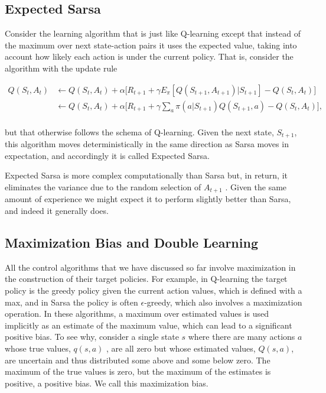 \documentclass{article}
\begin{document}
\subsection{Expected Sarsa}

Consider the learning algorithm that is just like Q-learning except that instead of the maximum over next state-action pairs 
it uses the expected value, taking into account how likely each action is under the current policy. That is, consider the algorithm with the update rule

$$
\begin{aligned} { Q ( S _ { t } , A _ { t } ) } & { { } \leftarrow Q ( S _ { t } , A _ { t } ) + \alpha \Big [ R _ { t + 1 } + \gamma E  _ { \pi } [ Q ( S _ { t + 1 } , A _ { t + 1 } ) | S _ { t + 1 } ] - Q ( S _ { t } , A _ { t } ) \Big ] } \\ { } & { { } \leftarrow Q ( S _ { t } , A _ { t } ) + \alpha \Big [ R _ { t + 1 } + \gamma \sum _ { a } \pi ( a | S _ { t + 1 } ) Q ( S _ { t + 1 } , a ) - Q ( S _ { t } , A _ { t } ) \Big ] , } \\ \end{aligned}
$$

but that otherwise follows the schema of Q-learning. Given the next state, $S _ { t + 1 }$, this algorithm moves deterministically in the same direction 
as Sarsa moves in expectation, and accordingly it is called Expected Sarsa.

Expected Sarsa is more complex computationally than Sarsa but, in return, it eliminates the variance due to the random selection of $A _ { t + 1 }$ . 
Given the same amount of experience we might expect it to perform slightly better than Sarsa, and indeed it generally does.

\subsection{Maximization Bias and Double Learning}

All the control algorithms that we have discussed so far involve maximization in the construction of their target policies. 
For example, in Q-learning the target policy is the greedy policy given the current action values, which is defined with a max, 
and in Sarsa the policy is often $\epsilon$-greedy, which also involves a maximization operation. In these algorithms, 
a maximum over estimated values is used implicitly as an estimate of the maximum value, which can lead to a significant positive bias. 
To see why, consider a single state $s$ where there are many actions $a$ whose true values, $q ( s , a )$ , are all zero but whose estimated values, 
$Q ( s , a )$, are uncertain and thus distributed some above and some below zero. The maximum of the true values is zero, 
but the maximum of the estimates is positive, a positive bias. We call this maximization bias.
\end{document}
